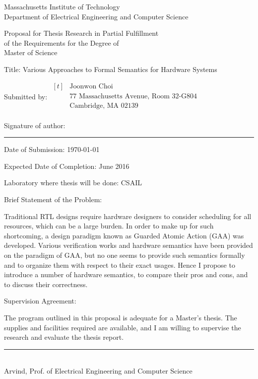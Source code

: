 
\begin{center}
  Massachusetts Institute of Technology\\
  Department of Electrical Engineering and Computer Science\dbsp

  Proposal for Thesis Research in Partial Fulfillment\\
  of the Requirements for the Degree of\\
  Master of Science\dbsp
\end{center}

{\parindent0pt

  Title: Various Approaches to Formal Semantics for Hardware Systems\dbsp

  Submitted by: $\begin{aligned}[t]
    &\textrm{Joonwon Choi}\\
    &\textrm{77 Massachusetts Avenue, Room 32-G804}\\
    &\textrm{Cambridge, MA 02139}\\
  \end{aligned}$\dbsp

  Signature of author: \rule{10cm}{0.4pt}\dbsp

  Date of Submission: \today\dbsp

  Expected Date of Completion: June 2016\dbsp

  Laboratory where thesis will be done: CSAIL\dbsp

  Brief Statement of the Problem:


  Traditional RTL designs require hardware designers to consider
  scheduling for all resources, which can be a large burden. In order
  to make up for such shortcoming, a design paradigm known as Guarded
  Atomic Action (GAA) was developed. Various verification works and
  hardware semantics have been provided on the paradigm of GAA, but no
  one seems to provide such semantics formally and to organize them
  with respect to their exact usages. Hence I propose to introduce a
  number of hardware semantics, to compare their pros and cons, and to
  discuss their correctness.\dbsp

  Supervision Agreement:

  The program outlined in this proposal is adequate for a Master's
  thesis. The supplies and facilities required are available, and I am
  willing to supervise the research and evaluate the thesis
  report.\dbsp
}

\begin{flushright}
  \rule{10cm}{0.4pt}\\
  Arvind, Prof. of Electrical Engineering and Computer Science
\end{flushright}

\newpage
